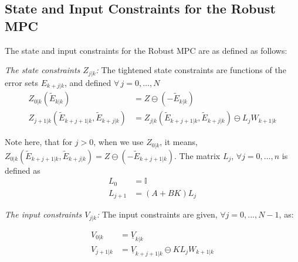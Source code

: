 \subsection{State and Input Constraints for the Robust MPC}
\label{sec:Constraints}
The state and input constraints for the Robust MPC are as defined as follows:

\textit{The state constraints $Z_{j|k}$:}
The tightened state constraints are functions of the error sets $E_{k+j|k}$, and defined $\forall\,j=0,\dotsc,N$
\small{
\begin{subequations} \label{eq:Set_constraints}
\begin{align}
Z_{0|k}(\tilde{E}_{k|k}) &=Z\ominus(-\tilde{E}_{k|k}) \\
Z_{j+1|k}(\tilde{E}_{k+j+1|k},\tilde{E}_{k+j|k}) &= Z_{j|k}(\tilde{E}_{k+j+1|k},\tilde{E}_{k+j|k})\ominus L_{j}W_{k+1|k}
\end{align}
\end{subequations}}

Note here, that for $j>0$, when we use $Z_{0|k}$, it means, $Z_{0|k}(\tilde{E}_ {k+j+1|k},\tilde{E}_ {k+j|k}) = Z \ominus (-\tilde{E}_{k+j+1|k})$. The matrix $L_j$, $\forall j=0,\dotsc,n$   is defined as
\begin{subequations} \label{eq:L_def}
\begin{align}
L_0&=\mathbb{I} \\
L_{j+1} &= (A+BK)L_j
\end{align}
\end{subequations}

\textit{The input constraints $V_{j|k}$:}
The input constraints are given, $\forall j=0,...,N-1$, as:

\begin{subequations}
\begin{align}
\label{eq:input_constraints}
V_{0|k} &= \underline{V}_{k|k} \\
V_{j+1|k} &= \underline{V}_{k+j+1|k} \ominus KL_jW_{k+1|k}
\end{align}
\end{subequations}


